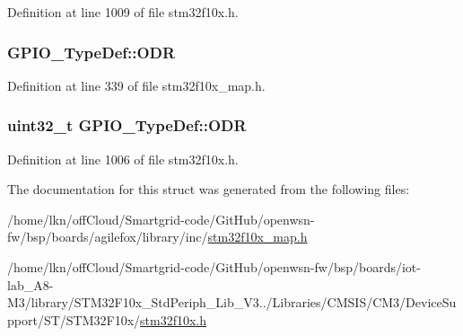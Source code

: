 Definition at line 1009 of file stm32f10x.\+h.

\subsubsection[{\texorpdfstring{O\+DR}{ODR}}]{ G\+P\+I\+O\+\_\+\+Type\+Def\+::\+O\+DR}\hypertarget{struct_g_p_i_o___type_def_a9c7de5aa4d2a71a4865e176795a146ed}{}\label{struct_g_p_i_o___type_def_a9c7de5aa4d2a71a4865e176795a146ed}


Definition at line 339 of file stm32f10x\+\_\+map.\+h.

\subsubsection[{\texorpdfstring{O\+DR}{ODR}}]{ {\bf uint32\+\_\+t} G\+P\+I\+O\+\_\+\+Type\+Def\+::\+O\+DR}\hypertarget{struct_g_p_i_o___type_def_a6fb78f4a978a36032cdeac93ac3c9c8b}{}\label{struct_g_p_i_o___type_def_a6fb78f4a978a36032cdeac93ac3c9c8b}


Definition at line 1006 of file stm32f10x.\+h.



The documentation for this struct was generated from the following files\+:\begin{DoxyCompactItemize}
\item 
/home/lkn/off\+Cloud/\+Smartgrid-\/code/\+Git\+Hub/openwsn-\/fw/bsp/boards/agilefox/library/inc/\hyperlink{agilefox_2library_2inc_2stm32f10x__map_8h}{stm32f10x\+\_\+map.\+h}\item 
/home/lkn/off\+Cloud/\+Smartgrid-\/code/\+Git\+Hub/openwsn-\/fw/bsp/boards/iot-\/lab\+\_\+\+A8-\/\+M3/library/\+S\+T\+M32\+F10x\+\_\+\+Std\+Periph\+\_\+\+Lib\+\_\+\+V3../\+Libraries/\+C\+M\+S\+I\+S/\+C\+M3/\+Device\+Support/\+S\+T/\+S\+T\+M32\+F10x/\hyperlink{iot-lab___a8-_m3_2library_2_s_t_m32_f10x___std_periph___lib___v3_85_80_2_libraries_2_c_m_s_i_s_26497265545392eb5694b064ae15018db}{stm32f10x.\+h}\end{DoxyCompactItemize}
